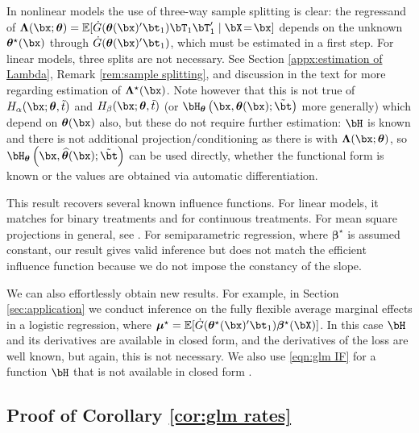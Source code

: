 \documentclass[12pt]{article}
\numberwithin{equation}{section}
\theoremstyle{definition}
\newcommand{\E}{\mathbb{E}}
\newcommand{\bmu}{\boldsymbol{\mu}}
\newcommand{\btheta}{\boldsymbol{\theta}}
\newcommand{\bbeta}{\boldsymbol{\beta}}
\newcommand{\bL}{\boldsymbol{\Lambda}}
\newcommand{\bmtrue}{\bmu^\star}
\newcommand{\bttrue}{\btheta^\star}
\newcommand{\bbtrue}{\bbeta^\star}
\newcommand{\bLtrue}{\bL^\star}
\newcommand{\btstar}{\tilde{\bt}}
\newcommand{\tstar}{\tilde{t}}
\newcommand{\bthat}{\bm{\widehat{\theta}}}
\begin{document}
\begin{appendices}
In nonlinear models the use of three-way sample splitting is clear: the regressand of $\bL(\bx; \btheta) = \E[\dot{G}(\btheta(\bx)'\bt_1)\bT_1\bT_1'\mid\bX \!=\! \bx]$ depends on the unknown $\bttrue(\bx)$ through $\dot{G}(\btheta(\bx)'\bt_1)$, which must be estimated in a first step. For linear models, three splits are not necessary. See Section \ref{appx:estimation of Lambda}, Remark \ref{rem:sample splitting}, and discussion in the text for more regarding estimation of $\bLtrue(\bx)$. Note however that this is not true of 
$H_\alpha(\bx; \btheta, \tstar)$ and $H_\beta(\bx; \btheta, \tstar)$ (or $\bH_{\btheta}\left(\bx, \btheta(\bx ); \btstar\right)$ more generally) which depend on $\btheta(\bx)$ also, but these do not require further estimation: $\bH$ is known and there is not additional projection/conditioning as there is with $\bL(\bx; \btheta)$, so $\bH_{\btheta}\left(\bx, \bthat(\bx ); \btstar\right)$ can be used directly, whether the functional form is known or the values are obtained via automatic differentiation.

This result recovers several known influence functions. For linear models, it matches \cite{Hahn1998_Ecma} for binary treatments and \cite{Graham-Pinto2022_JoE} for continuous treatments. For mean square projections in general, see \cite{Newey1994_Ecma}. For semiparametric regression, where $\bbtrue$ is assumed constant, our result gives valid inference but does not match the efficient influence function \citep{Mammen-vandeGeer1997_AoS,Vansteelandt-Dukes2022_JRSSB} because we do not impose the constancy of the slope.

We can also effortlessly obtain new results. For example, in Section \ref{sec:application} we conduct inference on the fully flexible average marginal effects in a logistic regression, where $\bmtrue = \E[\dot{G}(\bttrue(\bx)'\bt_1)\bbtrue(\bX)]$. In this case $\bH$ and its derivatives are available in closed form, and the derivatives of the loss are well known, but again, this is not necessary. We also use \eqref{eqn:glm IF} for a function $\bH$ that is not available in closed form \citep{Spall1986_CSTM,Jorgensen1993_Bmka}.





\subsection{Proof of Corollary \ref{cor:glm rates}}


\end{appendices}
\end{document}
